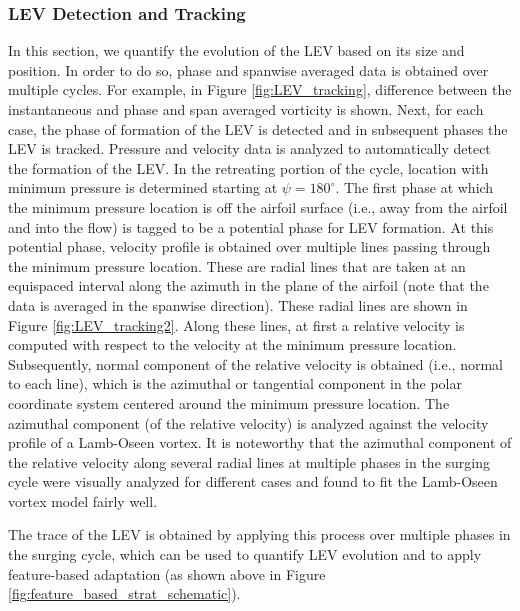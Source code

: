\subsubsection{LEV Detection and Tracking}


In this section, we quantify the evolution of the LEV based on its size and position.
In order to do so, phase and spanwise averaged data is obtained over multiple cycles. For example, in Figure \ref{fig:LEV_tracking}, difference between the instantaneous and phase and span averaged vorticity is shown.
Next, for each case, the phase of formation of the LEV is detected and in subsequent phases the LEV is tracked.
Pressure and velocity data is analyzed to automatically detect the formation of the LEV.
In the retreating portion of the cycle, location with minimum pressure is determined starting at $\psi=180^\circ$.
The first phase at which the minimum pressure location is off the airfoil surface (i.e., away from the airfoil and into the flow) is tagged to be a potential phase for LEV formation.
At this potential phase, velocity profile is obtained over multiple lines passing through the minimum pressure location.
These are radial lines that are taken at an equispaced interval along the azimuth in the plane of the airfoil (note that the data is averaged in the spanwise direction).
These radial lines are shown in Figure \ref{fig:LEV_tracking2}.
Along these lines, at first a relative velocity is computed with respect to the velocity at the minimum pressure location.
Subsequently, normal component of the relative velocity is obtained (i.e., normal to each line), which is the azimuthal or tangential component in the polar coordinate system centered around the minimum pressure location.
The azimuthal component (of the relative velocity) is analyzed against the velocity profile of a Lamb-Oseen vortex.
It is noteworthy that the azimuthal component of the relative velocity along several radial lines at multiple phases in the surging cycle were visually analyzed for different cases and found to fit the Lamb-Oseen vortex model fairly well.

The trace of the LEV is obtained by applying this process over multiple phases in the surging cycle, which can be used to quantify LEV evolution and to apply feature-based adaptation (as shown above in Figure \ref{fig:feature_based_strat_schematic}).

